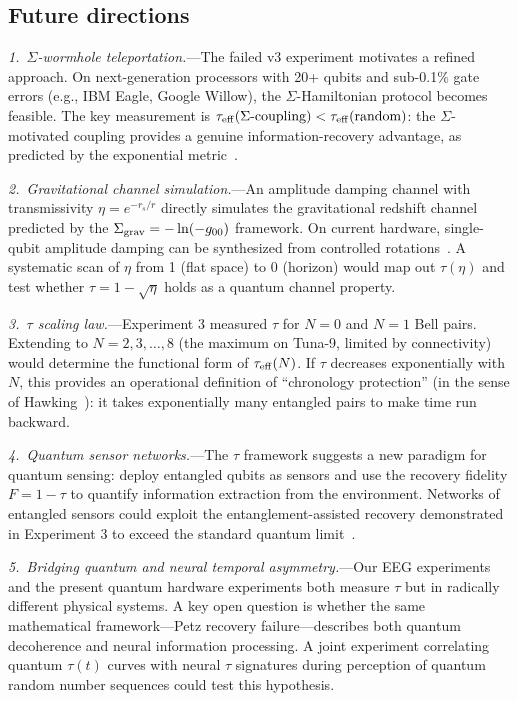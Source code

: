 \documentclass[prl,twocolumn,superscriptaddress,longbibliography,floatfix]{revtex4-2}
\newcommand{\tauasym}{\tau}
\begin{document}
\subsection{Future directions}
\label{sec:future}

\textit{1.\ $\Sigma$-wormhole teleportation.}---The failed v3
experiment motivates a refined approach.  On next-generation
processors with 20+ qubits and sub-0.1\% gate errors (e.g.,
IBM Eagle, Google Willow), the $\Sigma$-Hamiltonian protocol
becomes feasible.  The key measurement is
$\tauasym_{\rm eff}(\Sigma\text{-coupling}) <
\tauasym_{\rm eff}(\text{random})$: the $\Sigma$-motivated coupling
provides a genuine information-recovery advantage, as predicted by
the exponential metric~\cite{Huang2026b}.

\textit{2.\ Gravitational channel simulation.}---An amplitude
damping channel with transmissivity $\eta = e^{-r_s/r}$ directly
simulates the gravitational redshift channel predicted by the
$\Sigma_{\rm grav} = -\ln(-g_{00})$ framework.  On current hardware,
single-qubit amplitude damping can be synthesized from controlled
rotations~\cite{Nielsen2000}.  A systematic scan of $\eta$ from
1 (flat space) to 0 (horizon) would map out $\tauasym(\eta)$ and
test whether $\tauasym = 1 - \sqrt{\eta}$ holds as a quantum
channel property.

\textit{3.\ $\tauasym$ scaling law.}---Experiment 3 measured
$\tauasym$ for $N=0$ and $N=1$ Bell pairs.  Extending to
$N=2,3,\ldots,8$ (the maximum on Tuna-9, limited by connectivity)
would determine the functional form of
$\tauasym_{\rm eff}(N)$.  If $\tauasym$ decreases exponentially
with $N$, this provides an operational definition of
``chronology protection'' (in the sense of Hawking~\cite{Hawking1992}):
it takes exponentially many entangled pairs to make time run
backward.

\textit{4.\ Quantum sensor networks.}---The $\tauasym$ framework
suggests a new paradigm for quantum sensing: deploy entangled qubits
as sensors and use the recovery fidelity $F = 1 - \tauasym$ to
quantify information extraction from the environment.  Networks of
entangled sensors could exploit the entanglement-assisted recovery
demonstrated in Experiment 3 to exceed the standard quantum
limit~\cite{Giovannetti2006}.

\textit{5.\ Bridging quantum and neural temporal asymmetry.}---Our
EEG experiments~\cite{Huang2026c} and the present quantum hardware
experiments both measure $\tauasym$ but in radically different
physical systems.  A key open question is whether the same
mathematical framework---Petz recovery failure---describes both
quantum decoherence and neural information processing.  A joint
experiment correlating quantum $\tauasym(t)$ curves with
neural $\tauasym$ signatures during perception of quantum random
number sequences could test this hypothesis.
\end{document}
